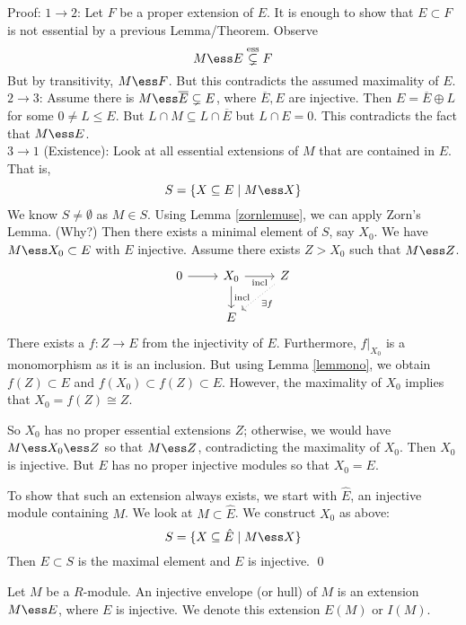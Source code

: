 Proof: $1\rightarrow 2$: Let $F$ be a proper extension of $E$. It is enough to show that $E \subset F$ is not essential by a previous Lemma/Theorem. Observe
\[
M \ess E \stackrel{\text{ess}}{\subsetneq} F
\]
But by transitivity, $M \ess F$. But this contradicts the assumed maximality of $E$. \\

$2 \rightarrow 3$: Assume there is $M \ess \overline{E} \subsetneq E$, where $\overline{E},E$ are injective. Then $E=\overline{E} \oplus L$ for some $0 \neq L \leq E$. But $L \cap M \subseteq L \cap \overline{E}$ but $L \cap E=0$. This contradicts the fact that $M \ess E$. \\

$3 \rightarrow 1$ (Existence): Look at all essential extensions of $M$ that are contained in $E$. That is, 
\[
S=\{X \subseteq E\;|\; M \ess X\}
\]
We know $S \neq \emptyset$ as $M \in S$. Using Lemma \ref{zornlemuse}, we can apply Zorn's Lemma. (Why?) Then there exists a minimal element of $S$, say $X_0$. We have $M \ess X_0 \subset E$ with $E$ injective. Assume there exists $Z>X_0$ such that $M \ess Z$.
\[
\begin{tikzcd}
0 \arrow{r} & X_0 \arrow[swap]{r}{\text{incl}} \arrow{d}{\text{incl}} & Z \arrow[dotted]{dl}{\exists f} \\
& E 
\end{tikzcd}
\]
There exists a $f: Z \rightarrow E$ from the injectivity of $E$. Furthermore, $f|_{X_0}$ is a monomorphism as it is an inclusion. But using Lemma \ref{lemmono}, we obtain $f(Z) \subset E$ and $f(X_0) \subset f(Z) \subset E$. However, the maximality of $X_0$ implies that $X_0=f(Z) \cong Z$.

So $X_0$ has no proper essential extensions $Z$; otherwise, we would have $M \ess X_0 \ess Z$ so that $M \ess Z$, contradicting the maximality of $X_0$. Then $X_0$ is injective. But $E$ has no proper injective modules so that $X_0=E$. 

To show that such an extension always exists, we start with $\hat{E}$, an injective module containing $M$. We look at $M \subset \hat{E}$. We construct $X_0$ as above:
\[
S=\{X\subseteq \hat{E}\;|\; M \ess X\}
\]
Then $E \subset S$ is the maximal element and $E$ is injective. \qed \\

\begin{dfn}
Let $M$ be a $R$-module. An injective envelope (or hull) of $M$ is an extension $M \ess E$, where $E$ is injective. We denote this extension $E(M)$ or $I(M)$. 
\end{dfn}

